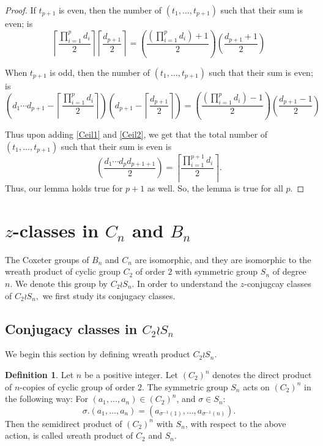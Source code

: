 \documentclass[12pt,twoside,reqno]{amsart}
\theoremstyle{definition}
\newtheorem{definition}[theorem]{Definition}
\numberwithin{equation}{section}
\newcommand{\Ceil}[1]{\left\lceil #1 \right\rceil}
\begin{document}
\begin{proof}
    If $t_{p+1}$ is even, then the number of $(t_1,\ldots, t_{p+1})$ such that their sum is even; is \begin{equation}\label{Ceil1}\displaystyle\Ceil{\frac{\prod_{i=1}^pd_i}{2}}\Ceil{\frac{d_{p+1}}{2}} = \left(\frac{\left(\prod_{i=1}^p d_i\right) + 1}{2}\right)\left(\frac{d_{p+1} + 1}{2}\right)\end{equation}

    When $t_{p+1}$ is odd, then the number of $(t_1,\ldots, t_{p+1})$ such that their sum is even; is \begin{equation}\label{Ceil2}\left(d_1\cdots d_{p+1} - \displaystyle\Ceil{\frac{\prod_{i=1}^pd_i}{2}}\right)\left(d_{p+1} - \Ceil{\frac{d_{p+1}}{2}}\right) = \left(\frac{\left(\prod_{i=1}^p d_i\right) - 1}{2}\right)\left(\frac{d_{p+1} - 1}{2}\right)\end{equation}

    Thus upon adding \ref{Ceil1} and \ref{Ceil2}, we get that the total number of $(t_1,\ldots, t_{p+1})$ such that their sum is even is $$\left(\frac{d_1\cdots d_pd_{p+1 + 1}}{2}\right) = \Ceil{\frac{\prod_{i=1}^{p+1}d_i}{2}}.$$
    Thus, our lemma holds true for $p+1$ as well. So, the lemma is true for all $p$.

\end{proof}
\section{$z$-classes in $C_n$ and $B_n$}\label{$z$-Classes of $C_n$}
The Coxeter groups of $B_n$ and $C_n$ are isomorphic, and they are isomorphic to the wreath product of cyclic group $C_2$ of order $2$ with symmetric group $S_n$ of degree $n.$ We denote this group by $C_2 \wr S_n.$ In order to understand the $z$-conjugcay classes of $C_2 \wr S_n,$ we first study its conjugacy classes.
\subsection{Conjugacy classes in $C_2 \wr S_n$}\label{ConjugacyclassesWCn}
We begin this section by defining wreath product $C_2 \wr S_n.$
\begin{definition}
Let $n$ be a positive integer. Let $(C_2)^n$ denotes the direct product of $n$-copies of cyclic group of order $2.$ The symmetric group $S_n$ acts on $(C_2)^n$ in the following way: For $(a_1,\ldots, a_n)\in (C_2)^n$, and $\sigma \in S_n$:
$$\sigma. (a_1,\ldots, a_n) = (a_{\sigma^{-1}(1)},\ldots, a_{\sigma^{-1}(n)}).$$ Then the semidirect product of $(C_2)^n$ with $S_n$, with respect to the above action, is called {\emph wreath product} of $C_2$ and $S_n$.
\end{definition}
\end{document}
